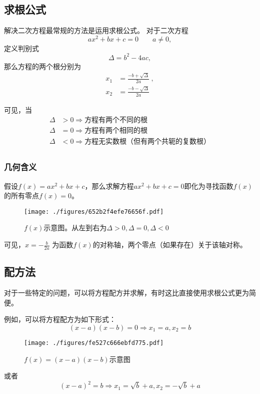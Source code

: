
\subsection{求根公式}
解决二次方程最常规的方法是运用求根公式。
对于二次方程$$ax^2+bx+c=0 \qquad a\neq 0,$$定义判别式$$\Delta = b^2-4ac,$$那么方程的两个根分别为$$
\begin{aligned}
x_1&=\frac{-b+\sqrt{\Delta}}{2a}~,\\
x_2&=\frac{-b-\sqrt{\Delta}}{2a}
\end{aligned}
$$

可见，当
$$
\begin{aligned}
\Delta &> 0 \Rightarrow \text{方程有两个不同的根}\\
\Delta &= 0 \Rightarrow \text{方程有两个相同的根}\\
\Delta &< 0 \Rightarrow \text{方程无实数根（但有两个共轭的复数根）}\\
\end{aligned}
$$

\subsubsection{几何含义}
假设$f(x)=ax^2+bx+c$，那么求解方程$ax^2+bx+c=0$即化为寻找函数$f(x)$的所有零点$f(x)=0$。
\begin{figure}[ht]
\centering
\texttt{[image: ./figures/652b2f4efe76656f.pdf]}
\caption{$f(x)$示意图。从左到右为$\Delta > 0, \Delta = 0, \Delta < 0$} \label{fig_quasol_1}
\end{figure}
可见，$x=-\frac{b}{2a}$ 为函数$f(x)$的对称轴，两个零点（如果存在）关于该轴对称。

\subsection{配方法}
对于一些特定的问题，可以将方程配方并求解，有时这比直接使用求根公式更为简便。

例如，可以将方程配方为如下形式：
$$(x-a)(x-b)=0\Rightarrow x_1=a, x_2=b$$
\begin{figure}[ht]
\centering
\texttt{[image: ./figures/fe527c666ebfd775.pdf]}
\caption{$f(x)=(x-a)(x-b)$示意图} \label{fig_quasol_2}
\end{figure}

或者
$$(x-a)^2=b\Rightarrow x_1=\sqrt{b}+a, x_2=-\sqrt{b}+a$$